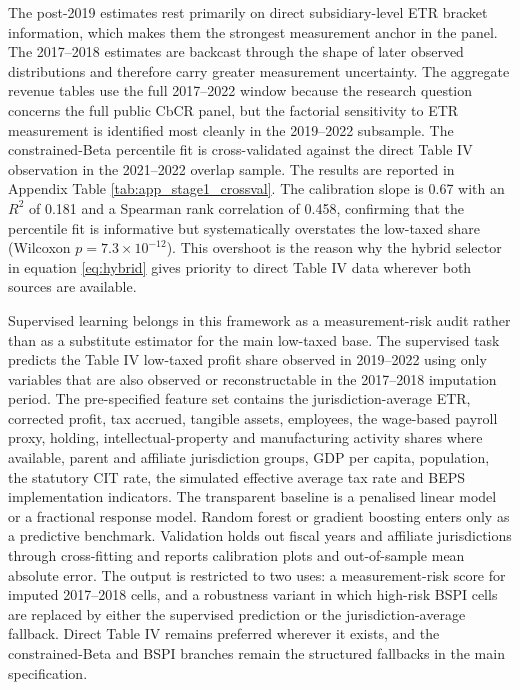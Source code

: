 \documentclass[11pt,a4paper]{article}
\begin{document}
The post-2019 estimates rest primarily on direct subsidiary-level ETR bracket information, which makes them the strongest measurement anchor in the panel. The 2017--2018 estimates are backcast through the shape of later observed distributions and therefore carry greater measurement uncertainty. The aggregate revenue tables use the full 2017--2022 window because the research question concerns the full public CbCR panel, but the factorial sensitivity to ETR measurement is identified most cleanly in the 2019--2022 subsample. The constrained-Beta percentile fit is cross-validated against the direct Table IV observation in the 2021--2022 overlap sample. The results are reported in Appendix Table \ref{tab:app_stage1_crossval}. The calibration slope is 0.67 with an $R^2$ of 0.181 and a Spearman rank correlation of 0.458, confirming that the percentile fit is informative but systematically overstates the low-taxed share (Wilcoxon $p = 7.3 \times 10^{-12}$). This overshoot is the reason why the hybrid selector in equation \eqref{eq:hybrid} gives priority to direct Table IV data wherever both sources are available.

Supervised learning belongs in this framework as a measurement-risk audit rather than as a substitute estimator for the main low-taxed base. The supervised task predicts the Table IV low-taxed profit share observed in 2019--2022 using only variables that are also observed or reconstructable in the 2017--2018 imputation period. The pre-specified feature set contains the jurisdiction-average ETR, corrected profit, tax accrued, tangible assets, employees, the wage-based payroll proxy, holding, intellectual-property and manufacturing activity shares where available, parent and affiliate jurisdiction groups, GDP per capita, population, the statutory CIT rate, the simulated effective average tax rate and BEPS implementation indicators. The transparent baseline is a penalised linear model or a fractional response model. Random forest or gradient boosting enters only as a predictive benchmark. Validation holds out fiscal years and affiliate jurisdictions through cross-fitting and reports calibration plots and out-of-sample mean absolute error. The output is restricted to two uses: a measurement-risk score for imputed 2017--2018 cells, and a robustness variant in which high-risk BSPI cells are replaced by either the supervised prediction or the jurisdiction-average fallback. Direct Table IV remains preferred wherever it exists, and the constrained-Beta and BSPI branches remain the structured fallbacks in the main specification.
\end{document}
